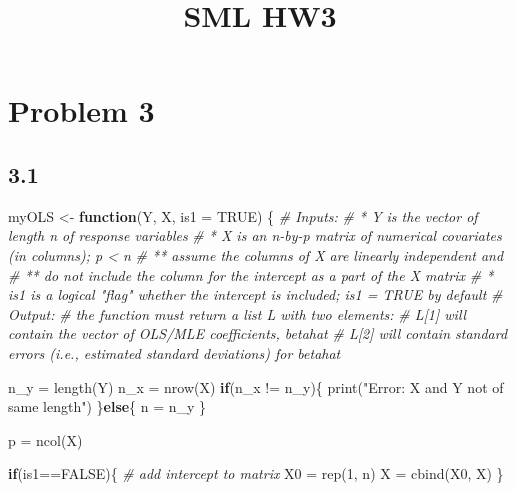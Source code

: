 \documentclass[
  11pt,
]{article}
\title{SML HW3}
\author{}
\date{\vspace{-2.5em}}
\newenvironment{Shaded}{\begin{snugshade}}{\end{snugshade}}
\newcommand{\AttributeTok}[1]{\textcolor[rgb]{0.77,0.63,0.00}{#1}}
\newcommand{\CommentTok}[1]{\textcolor[rgb]{0.56,0.35,0.01}{\textit{#1}}}
\newcommand{\ConstantTok}[1]{\textcolor[rgb]{0.00,0.00,0.00}{#1}}
\newcommand{\ControlFlowTok}[1]{\textcolor[rgb]{0.13,0.29,0.53}{\textbf{#1}}}
\newcommand{\DecValTok}[1]{\textcolor[rgb]{0.00,0.00,0.81}{#1}}
\newcommand{\FunctionTok}[1]{\textcolor[rgb]{0.00,0.00,0.00}{#1}}
\newcommand{\NormalTok}[1]{#1}
\newcommand{\OtherTok}[1]{\textcolor[rgb]{0.56,0.35,0.01}{#1}}
\newcommand{\SpecialCharTok}[1]{\textcolor[rgb]{0.00,0.00,0.00}{#1}}
\newcommand{\StringTok}[1]{\textcolor[rgb]{0.31,0.60,0.02}{#1}}
\begin{document}
\maketitle

\hypertarget{problem-3}{%
\section{Problem 3}\label{problem-3}}

\hypertarget{section}{%
\subsection{3.1}\label{section}}

\begin{Shaded}
\begin{Highlighting}[]
\NormalTok{myOLS }\OtherTok{\textless{}{-}} \ControlFlowTok{function}\NormalTok{(Y, X, }\AttributeTok{is1 =} \ConstantTok{TRUE}\NormalTok{) \{}
\CommentTok{\# Inputs:}
\CommentTok{\# * Y is the vector of length n of response variables}
\CommentTok{\# * X is an n{-}by{-}p matrix of numerical covariates (in columns); p \textless{} n}
\CommentTok{\# ** assume the columns of X are linearly independent and}
\CommentTok{\# ** do not include the column for the intercept as a part of the X matrix}
\CommentTok{\# * is1 is a logical "flag" whether the intercept is included; is1 = TRUE by default}
\CommentTok{\# Output:}
\CommentTok{\# the function must return a list L with two elements:}
\CommentTok{\# L[1] will contain the vector of OLS/MLE coefficients, betahat}
\CommentTok{\# L[2] will contain standard errors (i.e., estimated standard deviations) for betahat}

\NormalTok{  n\_y }\OtherTok{=} \FunctionTok{length}\NormalTok{(Y)}
\NormalTok{  n\_x }\OtherTok{=} \FunctionTok{nrow}\NormalTok{(X)}
  \ControlFlowTok{if}\NormalTok{(n\_x }\SpecialCharTok{!=}\NormalTok{ n\_y)\{}
    \FunctionTok{print}\NormalTok{(}\StringTok{"Error: X and Y not of same length"}\NormalTok{)}
\NormalTok{  \}}\ControlFlowTok{else}\NormalTok{\{}
\NormalTok{    n }\OtherTok{=}\NormalTok{ n\_y}
\NormalTok{  \}}
  
\NormalTok{  p }\OtherTok{=} \FunctionTok{ncol}\NormalTok{(X)}
  
  \ControlFlowTok{if}\NormalTok{(is1}\SpecialCharTok{==}\ConstantTok{FALSE}\NormalTok{)\{}
    \CommentTok{\# add intercept to matrix}
\NormalTok{    X0 }\OtherTok{=} \FunctionTok{rep}\NormalTok{(}\DecValTok{1}\NormalTok{, n)}
\NormalTok{    X }\OtherTok{=} \FunctionTok{cbind}\NormalTok{(X0, X)}
\NormalTok{  \}}
  

\end{Highlighting}
\end{Shaded}
\end{document}
